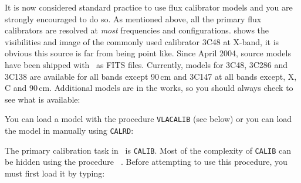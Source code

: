 

It is now considered standard practice to use flux calibrator models
and you are strongly encouraged to do so.  As mentioned above, all the
primary flux calibrators are resolved at {\it most} frequencies and
configurations.   shows the visibilities and image of
the commonly used calibrator 3C48 at X-band, it is obvious this source
is far from being point like.  Since April 2004, source models have
been shipped with \AIPS\ as FITS files. Currently, models for 3C48,
3C286 and 3C138 are available for all bands except 90\,cm and 3C147 at
all bands except, X, C and 90\,cm.  Additional models are in the
works, so you should always check to see what is available:

You can load a model with the procedure {\tt VLACALIB} (see below) or
you can load the model in manually using {\tt CALRD}:


The primary calibration task in \AIPS\ is {\tt CALIB}\@.  Most of the
complexity of {\tt CALIB} can be hidden using the procedure {\tt
{}}\@.  Before attempting to use this procedure, you must
first load it by typing:

